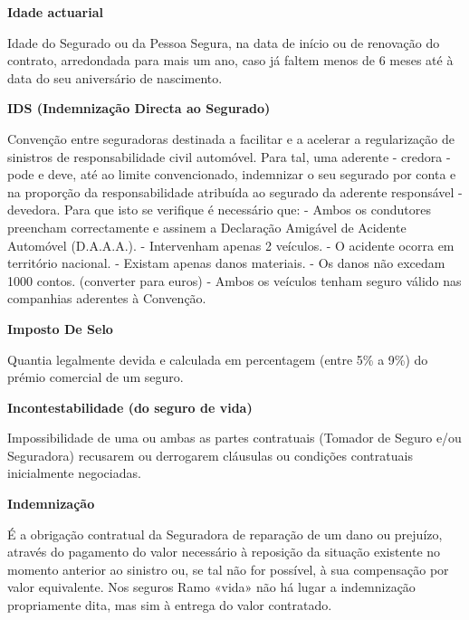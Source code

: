 \begin{description}
\item \textbf{Idade actuarial}

Idade do Segurado ou da Pessoa Segura, na data de início ou de renovação do contrato, arredondada para mais um ano, caso já faltem menos de 6 meses até à data do seu aniversário de nascimento.
\end{description}

\begin{description}
\item \textbf{IDS (Indemnização Directa ao Segurado)}

Convenção entre seguradoras destinada a facilitar e a acelerar a regularização de sinistros de responsabilidade civil automóvel. Para tal, uma aderente - credora - pode e deve, até ao limite convencionado, indemnizar o seu segurado por conta e na proporção da responsabilidade atribuída ao segurado da aderente responsável - devedora. Para que isto se verifique é necessário que: - Ambos os condutores preencham correctamente e assinem a Declaração Amigável de Acidente Automóvel (D.A.A.A.). - Intervenham apenas 2 veículos. - O acidente ocorra em território nacional. - Existam apenas danos materiais. - Os danos não excedam 1000 contos. (converter para euros) - Ambos os veículos tenham seguro válido nas companhias aderentes à Convenção.
\end{description}

\begin{description}
\item \textbf{Imposto De Selo}

Quantia legalmente devida e calculada em percentagem (entre 5\% a 9\%) do prémio comercial de um seguro.
\end{description}

\begin{description}
\item \textbf{Incontestabilidade (do seguro de vida)}

Impossibilidade de uma ou ambas as partes contratuais (Tomador de Seguro e/ou Seguradora) recusarem ou derrogarem cláusulas ou condições contratuais inicialmente negociadas.
\end{description}

\begin{description}
\item \textbf{Indemnização}

É a obrigação contratual da Seguradora de reparação de um dano ou prejuízo, através do pagamento do valor necessário à reposição da situação existente no momento anterior ao sinistro ou, se tal não for possível, à sua compensação por valor equivalente. Nos seguros Ramo «vida» não há lugar a indemnização propriamente dita, mas sim à entrega do valor contratado.
\end{description}

